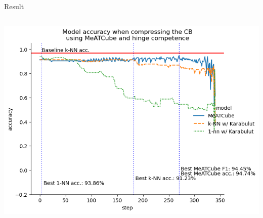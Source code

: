 \documentclass[]{beamer}
\begin{document}
\begin{frame}{Result}
\begin{columns}
\begin{column}{.65\textwidth}
            \includegraphics[width=.8\textwidth]{../results-weight-estim+/figs/breast+cancer+wisconsin+diagnostic.png}
        \end{column}
    \end{columns}
\end{frame}
\end{document}
